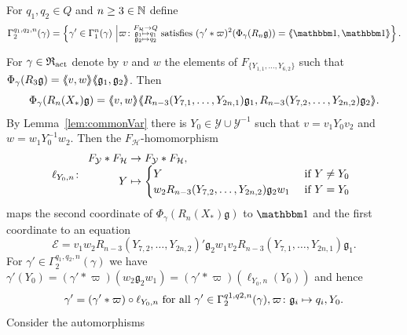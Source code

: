 \documentclass[a4paper,11pt]{amsart}
\begin{document}
For $q_1,q_2 \in Q$ and $n\geq3\in \mathbb{N}$ define
\[\Gamma_2^{q_1,q_2,n}(\gamma) = \left\{\gamma'\in \Gamma_1^n(\gamma) \bigmid
\varpi\colon \substack{F_{\mathcal{H}}\to Q\\
      \mathfrak g_1\mapsto q_1 \\
      \mathfrak g_2\mapsto q_2 }\text{ satisfies }
    (\gamma'*\varpi)^2(\Phi_\gamma(R_n \mathfrak g))=\pair{\id,\id}\right\}.\]

For $\gamma\in\mathfrak{R}_{\operatorname{act}}$ denote by $v$ and $w$ the elements of $F_{\{Y_
{1,1},\ldots,Y_{6,2}\}}$ such
that $\Phi_\gamma(R_3 \mathfrak g)=\langle\negthickspace\langle v,w\rangle\negthickspace\rangle\langle\negthickspace\langle\mathfrak g_1, \mathfrak
g_2\rangle\negthickspace\rangle$. 
Then \[\Phi_\gamma(R_n(X_*) \mathfrak g)=\langle\negthickspace\langle v,w\rangle\negthickspace\rangle
\langle\negthickspace\langle R_{n-3}(Y_{7,1},\ldots,Y_{2n,1})\mathfrak g_1,
R_{n-3}(Y_{7,2},\ldots,Y_{2n,2})\mathfrak g_2\rangle\negthickspace\rangle.\] By Lemma~\ref{lem:commonVar}
there is $Y_0 \in \mathcal{Y}\cup 
\mathcal{Y}^{-1}$ such that $v=v_1Y_0v_2$ and $w=w_1Y_0^{-1}w_2$. Then the
$F_{\mathcal{H}}$-homomorphism
\[\ell_{Y_0,n}\colon\begin{array}{r@{\;}l}
                    F_{\mathcal{Y}}*F_{\mathcal H}&\to F_{\mathcal{Y}}*F_
                    {\mathcal H},\\
                    Y &\mapsto \begin{cases}
    Y &\text{ if } Y\neq {Y_0} \\
    w_2R_{n-3}(Y_{7,2},\ldots,Y_{2n,2})\mathfrak g_2 w_1&\text{ if }Y= {Y_0} 
  \end{cases}\end{array}
\]
maps the second coordinate of $\Phi_\gamma(R_n(X_*)\mathfrak{g})$ to $\id$
and the first coordinate to an equation 
\[\mathcal{E}=v_1w_2R_{n-3}(Y_{7,2},\ldots,Y_{2n,2})'\mathfrak g_2w_1v_2R_
{n-3}(Y_{7,1},\ldots,Y_{2n,1}) \mathfrak g_1.\]
For $\gamma'\in \Gamma_2^{q_1,q_2,n}(\gamma)$ we have
$\gamma'(Y_0)=({\gamma'*\varpi})(w_2\mathfrak g_2w_1)=(
{\gamma'*\varpi})(\ell_{Y_0,n}(Y_0))$ and hence
\begin{equation}
\gamma'=(\gamma'*\varpi)\circ \ell_{Y_0,n}\textup{ for all }\gamma'\in
\Gamma_2^{q1,q2,n}(\gamma),\varpi\colon \mathfrak{g}_i\mapsto q_i,Y_0.
\label{eq:gamma'invariantUnderEll}
\end{equation} 
Consider the automorphisms
\end{document}

